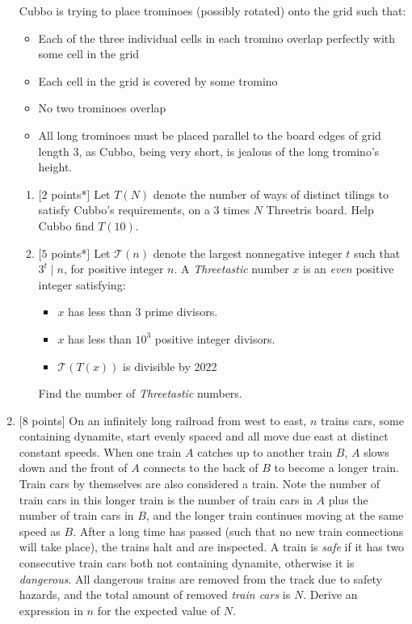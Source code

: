 \begin{enumerate}[align=left,start=1,label=\textbf{\textcolor{meablue}{Problem \arabic*}}]
        Cubbo is trying to place trominoes (possibly rotated) onto the grid such that:
        \begin {itemize}
        \item Each of the three individual cells in each tromino overlap perfectly with some cell in the grid
        \item Each cell in the grid is covered by some tromino
        \item No two trominoes overlap
        \item All long trominoes must be placed parallel to the board edges of grid length 3, as Cubbo, being very short, is jealous of the long tromino's height.
        \end {itemize}
        
    \begin{enumerate}
        \item {[$2$ points*]} Let $T(N)$ denote the number of ways of distinct tilings to satisfy Cubbo's requirements, on a 3 times $N$ Threetris board. Help Cubbo find $T(10)$.
        \item {[$5$ points*]} Let $\mathcal{T}(n)$ denote the largest nonnegative integer $t$ such that $3^t \mid n$, for positive integer $n$. A \emph{Threetastic} number $x$ is an \emph{even} positive integer satisfying:
        \begin{itemize}
            \item $x$ has less than 3 prime divisors. 
            \item $x$ has less than $10^3$ positive integer divisors. 
            \item $\mathcal{T}(T(x))$ is divisible by 2022
        \end{itemize}
        
        Find the number of \emph{Threetastic} numbers.
    \end{enumerate}
    \item {[$8$ points]} On an infinitely long railroad from west to east, $n$ trains cars, some containing dynamite, start evenly spaced and all move due east at distinct constant speeds. When one train $A$ catches up to another train $B$, $A$ slows down and the front of $A$ connects to the back of $B$ to become a longer train. Train cars by themselves are also considered a train. Note the number of train cars in this longer train is the number of train cars in $A$ plus the number of train cars in $B$, and the longer train continues moving at the same speed as $B$. After a long time has passed (such that no new train connections will take place), the trains halt and are inspected. A train is \emph{safe} if it has two consecutive train cars both not containing dynamite, otherwise it is \emph{dangerous}. All dangerous trains are removed from the track due to safety hazards, and the total amount of removed \emph{train cars} is $N$. Derive an expression in $n$ for the expected value of $N$. 
\end{enumerate}
 
